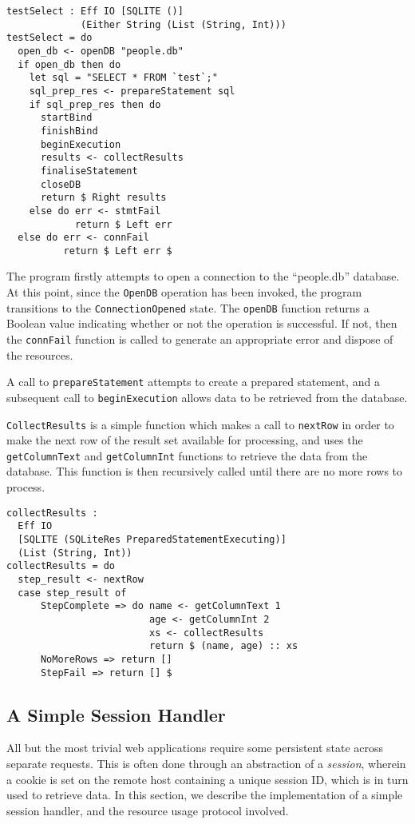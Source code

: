 \documentclass[preprint]{sigplanconf}
\begin{document}
\begin{verbatim}
testSelect : Eff IO [SQLITE ()] 
             (Either String (List (String, Int)))
testSelect = do
  open_db <- openDB "people.db"
  if open_db then do
    let sql = "SELECT * FROM `test`;"
    sql_prep_res <- prepareStatement sql
    if sql_prep_res then do 
      startBind
      finishBind
      beginExecution
      results <- collectResults
      finaliseStatement
      closeDB
      return $ Right results
    else do err <- stmtFail
            return $ Left err
  else do err <- connFail
          return $ Left err $
\end{verbatim}

The program firstly attempts to open a connection to the ``people.db'' database. At this point, since the \texttt{OpenDB} operation has been invoked, the program transitions to the \texttt{ConnectionOpened} state. The \texttt{openDB} function returns a Boolean value indicating whether or not the operation is successful. If not, then the \texttt{connFail} function is called to generate an appropriate error and dispose of the resources.

A call to \texttt{prepareStatement} attempts to create a prepared statement, and a subsequent call to \texttt{beginExecution} allows data to be retrieved from the database.

\texttt{CollectResults} is a simple function which makes a call to \texttt{nextRow} in order to make the next row of the result set available for processing, and uses the \texttt{getColumnText} and \texttt{getColumnInt} functions to retrieve the data from the database. This function is then recursively called until there are no more rows to process.
{\small
\begin{verbatim}
collectResults : 
  Eff IO 
  [SQLITE (SQLiteRes PreparedStatementExecuting)] 
  (List (String, Int))
collectResults = do
  step_result <- nextRow
  case step_result of
      StepComplete => do name <- getColumnText 1
                         age <- getColumnInt 2
                         xs <- collectResults
                         return $ (name, age) :: xs
      NoMoreRows => return []
      StepFail => return [] $
\end{verbatim}
}


\subsection{A Simple Session Handler}
All but the most trivial web applications require some persistent state across separate requests. This is often done through an abstraction of a \textit{session}, wherein a cookie is set on the remote host containing a unique session ID, which is in turn used to retrieve data. In this section, we describe the implementation of a simple session handler, and the resource usage protocol involved. 
\end{document}
